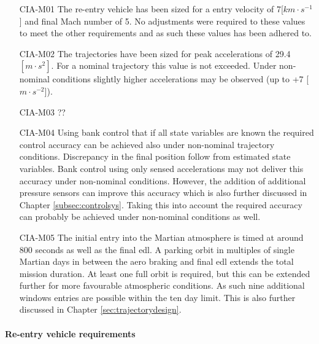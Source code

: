 \begin{itemize}
\item[CIA-M01]	The re-entry vehicle has been sized for a entry velocity of 7[$km \cdot s^{-1}$] and final Mach number of 5. No adjustments were required to these values to meet the other requirements and as such these values has been adhered to. 
\item[CIA-M02]	The trajectories have been sized for peak accelerations of 29.4 $[m \cdot s^{2}]$. For a nominal trajectory this value is not exceeded. Under non-nominal conditions slightly higher accelerations may be observed (up to +7 [$m \cdot s ^{-2}$]). 
\item[CIA-M03] ??
\item[CIA-M04]	Using bank control that if all state variables are known the required control accuracy can be achieved also under non-nominal trajectory conditions. Discrepancy in the final position follow from estimated state variables. Bank control using only sensed accelerations may not deliver this accuracy under non-nominal conditions. However, the addition of additional pressure sensors can improve this accuracy which is also further discussed in Chapter \ref{subsec:controlsys}. Taking this into account the required accuracy can probably be achieved under non-nominal conditions as well.
\item[CIA-M05] The initial entry into the Martian atmosphere is timed at around 800 seconds as well as the final \gls{edl}. A parking orbit in multiples of single Martian days in between the aero braking and final \gls{edl} extends the total mission duration. At least one full orbit is required, but this can be extended further for more favourable atmospheric conditions. As such nine additional windows entries are possible within the ten day limit. This is also further discussed  in Chapter \ref{sec:trajectorydesign}.

\end{itemize}

\paragraph{Re-entry vehicle requirements}


